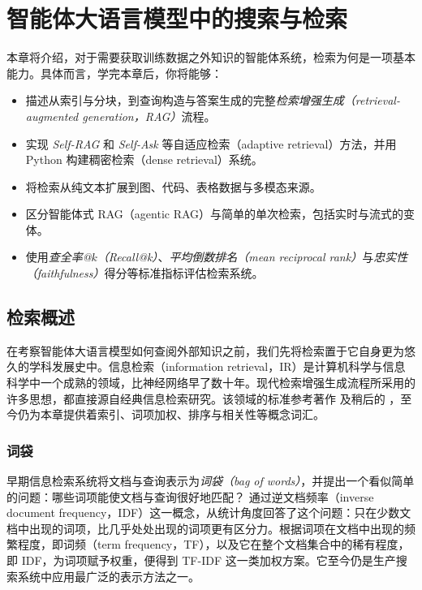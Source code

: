 \chapter{智能体大语言模型中的搜索与检索}\label{sec:rag}


\begin{learningbox}
本章将介绍，对于需要获取训练数据之外知识的智能体系统，检索为何是一项基本能力。具体而言，学完本章后，你将能够：
\begin{itemize}[leftmargin=*, nosep]
    \item 描述从索引与分块，到查询构造与答案生成的完整{\em 检索增强生成（retrieval-augmented generation，RAG）}流程。
    \item 实现 \textit{Self-RAG} 和 \textit{Self-Ask} 等自适应检索（adaptive retrieval）方法，并用 Python 构建稠密检索（dense retrieval）系统。
    \item 将检索从纯文本扩展到图、代码、表格数据与多模态来源。
    \item 区分智能体式 RAG（agentic RAG）与简单的单次检索，包括实时与流式的变体。
    \item 使用\textit{查全率@$k$（Recall@k）}、\textit{平均倒数排名（mean reciprocal rank）}与\textit{忠实性（faithfulness）}得分等标准指标评估检索系统。
\end{itemize}
\end{learningbox}



\section{检索概述}
\label{sec:retrieval-origins}

在考察智能体大语言模型如何查阅外部知识之前，我们先将检索置于它自身更为悠久的学科发展史中。信息检索（information retrieval，IR）是计算机科学与信息科学中一个成熟的领域，比神经网络早了数十年。现代检索增强生成流程所采用的许多思想，都直接源自经典信息检索研究。该领域的标准参考著作 \citet{salton1983introduction} 及稍后的 \citet{manning2008introduction}，至今仍为本章提供着索引、词项加权、排序与相关性等概念词汇。

\subsection{词袋}

早期信息检索系统将文档与查询表示为\emph{词袋（bag of words）}，并提出一个看似简单的问题：哪些词项能使文档与查询很好地匹配？\citet{sparckjones1972statistical} 通过逆文档频率（inverse document frequency，IDF）这一概念，从统计角度回答了这个问题：只在少数文档中出现的词项，比几乎处处出现的词项更有区分力。根据词项在文档中出现的频繁程度，即词频（term frequency，TF），以及它在整个文档集合中的稀有程度，即 IDF，为词项赋予权重，便得到 TF-IDF 这一类加权方案。它至今仍是生产搜索系统中应用最广泛的表示方法之一。

